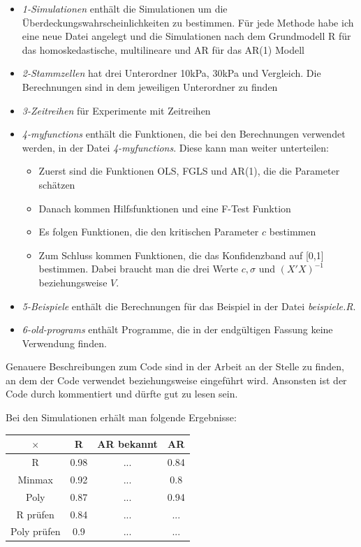 \documentclass[12pt,a4paper]{article}
\theoremstyle{definition}
\theoremstyle{definition}
\theoremstyle{definition}
\newcommand{\UeberRR}{0.98}
\newcommand{\UeberRMinmax}{0.92}
\newcommand{\UeberRMinmaxPoly}{0.87}
\newcommand{\UeberARbekanntR}{...}
\newcommand{\UeberARbekanntMinmax}{...}
\newcommand{\UeberARbekanntMinmaxPoly}{...}
\newcommand{\UeberARR}{0.84}
\newcommand{\UeberARMinmax}{0.8}
\newcommand{\UeberARMinmaxPoly}{0.94}
\newcommand{\UeberRRpruefen}{0.84}
\newcommand{\UeberRMinmaxPolypruefen}{0.9}
\newcommand{\UeberARbekanntRpruefen}{...}
\newcommand{\UeberARbekanntMinmaxPolypruefen}{...}
\newcommand{\UeberARRpruefen}{...}
\newcommand{\UeberARMinmaxPolypruefen}{...}
\begin{document}
\begin{itemize}
\item \textit{1-Simulationen} enthält die Simulationen um die Überdeckungswahrscheinlichkeiten zu bestimmen. Für jede Methode habe ich eine neue Datei angelegt und die Simulationen nach dem Grundmodell R für das homoskedastische, multilineare und AR für das AR(1) Modell
\item \textit{2-Stammzellen} hat drei Unterordner 10kPa, 30kPa und Vergleich. Die Berechnungen sind in dem jeweiligen Unterordner zu finden
\item \textit{3-Zeitreihen} für Experimente mit Zeitreihen
\item \textit{4-myfunctions} enthält die Funktionen, die bei den Berechnungen verwendet werden,  in der Datei \textit{4-myfunctions}. Diese kann man weiter unterteilen:
\begin{itemize}
\item Zuerst sind die Funktionen OLS, FGLS und AR(1), die die Parameter schätzen
\item Danach kommen Hilfsfunktionen und eine F-Test Funktion
\item Es folgen Funktionen, die den kritischen Parameter $c$ bestimmen
\item Zum Schluss kommen Funktionen, die das Konfidenzband auf [0,1] bestimmen. Dabei braucht man die drei Werte $c, \hat{\sigma}$ und $(X'X)^{-1}$ beziehungsweise $V$.
\end{itemize}
\item \textit{5-Beispiele} enthält die Berechnungen für das Beispiel in der Datei \textit{beispiele.R}.
\item \textit{6-old-programs} enthält Programme, die in der endgültigen Fassung keine Verwendung finden. 
\end{itemize}

Genauere Beschreibungen zum Code sind in der Arbeit an der Stelle zu finden, an dem der Code verwendet beziehungsweise eingeführt wird. Ansonsten ist der Code durch kommentiert und dürfte gut zu lesen sein.

Bei den Simulationen erhält man folgende Ergebnisse:

\begin{center}
\begin{tabular}{|c|c|c|c|}
\hline 
$\times$ & R & AR bekannt & AR \\ 
\hline 
R		 & \UeberRR		  & \UeberARbekanntR & \UeberARR \\ 
\hline 
Minmax	 & \UeberRMinmax  & \UeberARbekanntMinmax & \UeberARMinmax \\ 
\hline 
Poly  & \UeberRMinmaxPoly & \UeberARbekanntMinmaxPoly & \UeberARMinmaxPoly \\ 
\hline 
R prüfen    & \UeberRRpruefen & \UeberARbekanntRpruefen & \UeberARRpruefen \\ 
\hline 
Poly prüfen	& \UeberRMinmaxPolypruefen & \UeberARbekanntMinmaxPolypruefen & \UeberARMinmaxPolypruefen \\ 
\hline 
\end{tabular} 
\end{center}
\end{document}
